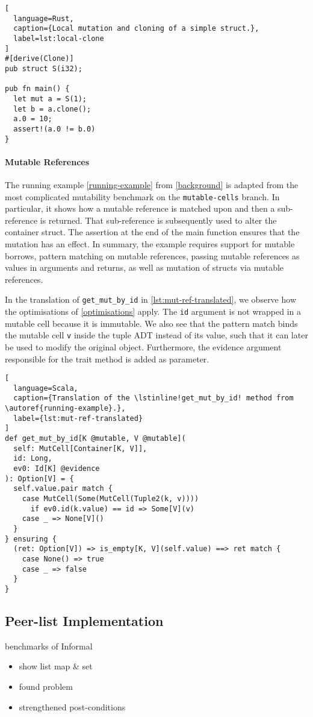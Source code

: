\begin{lstlisting}[
  language=Rust,
  caption={Local mutation and cloning of a simple struct.},
  label=lst:local-clone
]
#[derive(Clone)]
pub struct S(i32);

pub fn main() {
  let mut a = S(1);
  let b = a.clone();
  a.0 = 10;
  assert!(a.0 != b.0)
}
\end{lstlisting}


\paragraph{Mutable References}

The running example \autoref{running-example} from \autoref{background} is
adapted from the most complicated mutability benchmark on the
\texttt{mutable-cells} branch. In particular, it shows how a mutable reference
is matched upon and then a sub-reference is returned. That sub-reference is
subsequently used to alter the container struct. The assertion at the end of the
main function ensures that the mutation has an effect. In summary, the example
requires support for mutable borrows, pattern matching on mutable references,
passing mutable references as values in arguments and returns, as well as
mutation of structs via mutable references.

In the translation of \lstinline!get_mut_by_id! in
\autoref{lst:mut-ref-translated}, we observe how the optimisations of
\autoref{optimisations} apply. The \lstinline!id! argument is not wrapped in a
mutable cell because it is immutable. We also see that the pattern match binds
the mutable cell \lstinline!v! inside the tuple ADT instead of its value, such
that it can later be used to modify the original object. Furthermore, the
evidence argument responsible for the trait method is added as parameter.

\begin{lstlisting}[
  language=Scala,
  caption={Translation of the \lstinline!get_mut_by_id! method from \autoref{running-example}.},
  label={lst:mut-ref-translated}
]
def get_mut_by_id[K @mutable, V @mutable](
  self: MutCell[Container[K, V]],
  id: Long,
  ev0: Id[K] @evidence
): Option[V] = {
  self.value.pair match {
    case MutCell(Some(MutCell(Tuple2(k, v))))
      if ev0.id(k.value) == id => Some[V](v)
    case _ => None[V]()
  }
} ensuring {
  (ret: Option[V]) => is_empty[K, V](self.value) ==> ret match {
    case None() => true
    case _ => false
  }
}
\end{lstlisting}

\subsection{Peer-list Implementation}
\label{peerlist}

benchmarks of Informal

\begin{itemize}
  \item show list map \& set
  \item found problem
  \item strengthened post-conditions
\end{itemize}
